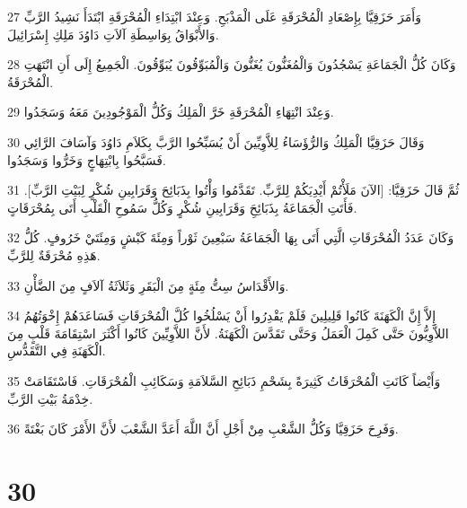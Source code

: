 \par 27 وَأَمَرَ حَزَقِيَّا بِإِصْعَادِ الْمُحْرَقَةِ عَلَى الْمَذْبَحِ. وَعِنْدَ ابْتِدَاءِ الْمُحْرَقَةِ ابْتَدَأَ نَشِيدُ الرَّبِّ وَالأَبْوَاقُ بِوَاسِطَةِ آلاَتِ دَاوُدَ مَلِكِ إِسْرَائِيلَ.
\par 28 وَكَانَ كُلُّ الْجَمَاعَةِ يَسْجُدُونَ وَالْمُغَنُّونَ يُغَنُّونَ وَالْمُبَوِّقُونَ يُبَوِّقُونَ. الْجَمِيعُ إِلَى أَنِ انْتَهَتِ الْمُحْرَقَةُ.
\par 29 وَعِنْدَ انْتِهَاءِ الْمُحْرَقَةِ خَرَّ الْمَلِكُ وَكُلُّ الْمَوْجُودِينَ مَعَهُ وَسَجَدُوا.
\par 30 وَقَالَ حَزَقِيَّا الْمَلِكُ وَالرُّؤَسَاءُ لِلاَّوِيِّينَ أَنْ يُسَبِّحُوا الرَّبَّ بِكَلاَمِ دَاوُدَ وَآسَافَ الرَّائِي فَسَبَّحُوا بِابْتِهَاجٍ وَخَرُّوا وَسَجَدُوا.
\par 31 ثُمَّ قَالَ حَزَقِيَّا: [الآنَ مَلَأْتُمْ أَيْدِيَكُمْ لِلرَّبِّ. تَقَدَّمُوا وَأْتُوا بِذَبَائِحَ وَقَرَابِينِ شُكْرٍ لِبَيْتِ الرَّبِّ]. فَأَتَتِ الْجَمَاعَةُ بِذَبَائِحَِ وَقَرَابِينِ شُكْرٍ وَكُلُّ سَمُوحِ الْقَلْبِ أَتَى بِمُحْرَقَاتٍ.
\par 32 وَكَانَ عَدَدُ الْمُحْرَقَاتِ الَّتِي أَتَى بِهَا الْجَمَاعَةُ سَبْعِينَ ثَوْراً وَمِئَةَ كَبْشٍ وَمِئَتَيْ خَرُوفٍ. كُلُّ هَذِهِ مُحْرَقَةٌ لِلرَّبِّ.
\par 33 وَالأَقْدَاسُ سِتُّ مِئَةٍ مِنَ الْبَقَرِ وَثَلاَثَةُ آلاَفٍ مِنَ الضَّأْنِ.
\par 34 إِلاَّ إِنَّ الْكَهَنَةَ كَانُوا قَلِيلِينَ فَلَمْ يَقْدِرُوا أَنْ يَسْلُخُوا كُلَّ الْمُحْرَقَاتِ فَسَاعَدَهُمْ إِخْوَتُهُمُ اللاَّوِيُّونَ حَتَّى كَمِلَ الْعَمَلُ وَحَتَّى تَقَدَّسَ الْكَهَنَةُ. لأَنَّ اللاَّوِيِّينَ كَانُوا أَكْثَرَ اسْتِقَامَةَ قَلْبٍ مِنَ الْكَهَنَةِ فِي التَّقَدُّسِ.
\par 35 وَأَيْضاً كَانَتِ الْمُحْرَقَاتُ كَثِيرَةً بِشَحْمِ ذَبَائِحِ السَّلاَمَةِ وَسَكَائِبِ الْمُحْرَقَاتِ. فَاسْتَقَامَتْ خِدْمَةُ بَيْتِ الرَّبِّ.
\par 36 وَفَرِحَ حَزَقِيَّا وَكُلُّ الشَّعْبِ مِنْ أَجْلِ أَنَّ اللَّهَ أَعَدَّ الشَّعْبَ لأَنَّ الأَمْرَ كَانَ بَغْتَةً.

\chapter{30}

